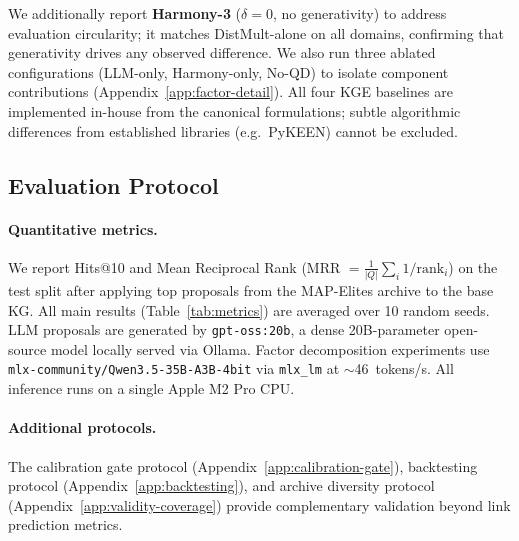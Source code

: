 \noindent We additionally report \textbf{Harmony-3} ($\delta = 0$, no
generativity) to address evaluation circularity; it matches DistMult-alone
on all domains, confirming that generativity drives any observed difference.
We also run three ablated configurations (LLM-only, Harmony-only, No-QD) to
isolate component contributions (Appendix~\ref{app:factor-detail}).
All four KGE baselines are implemented in-house from the canonical
formulations; subtle algorithmic differences from established libraries
(e.g.\ PyKEEN) cannot be excluded.

\subsection{Evaluation Protocol}

\paragraph{Quantitative metrics.}
We report Hits@10 and Mean Reciprocal Rank
(MRR $= \frac{1}{|Q|}\sum_i 1/\text{rank}_i$) on the test split after
applying top proposals from the MAP-Elites archive to the base KG.  All main
results (Table~\ref{tab:metrics}) are averaged over 10 random seeds.  LLM
proposals are generated by \texttt{gpt-oss:20b}, a dense 20B-parameter
open-source model locally served via Ollama.  Factor decomposition experiments
use \texttt{mlx-community/Qwen3.5-35B-A3B-4bit} via \texttt{mlx\_lm} at
$\sim$46~tokens/s.  All inference runs on a single Apple M2 Pro CPU.

\paragraph{Additional protocols.}
The calibration gate protocol (Appendix~\ref{app:calibration-gate}),
backtesting protocol (Appendix~\ref{app:backtesting}), and archive diversity
protocol (Appendix~\ref{app:validity-coverage}) provide complementary
validation beyond link prediction metrics.

